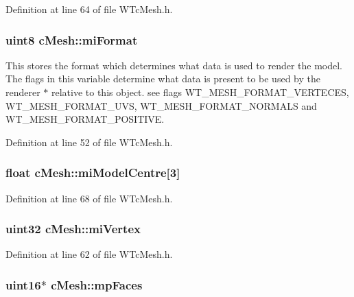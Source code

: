 Definition at line 64 of file WTcMesh.h.

\hypertarget{classc_mesh_a6a9c96e41eef3faed3c43ab69e8be5c6}{
\subsubsection[{miFormat}]{\setlength{\rightskip}{0pt plus 5cm}uint8 {\bf cMesh::miFormat}}}
\label{classc_mesh_a6a9c96e41eef3faed3c43ab69e8be5c6}


This stores the format which determines what data is used to render the model. The flags in this variable determine what data is present to be used by the renderer $\ast$ relative to this object. see flags WT\_\-MESH\_\-FORMAT\_\-VERTECES, WT\_\-MESH\_\-FORMAT\_\-UVS, WT\_\-MESH\_\-FORMAT\_\-NORMALS and WT\_\-MESH\_\-FORMAT\_\-POSITIVE. 



Definition at line 52 of file WTcMesh.h.

\hypertarget{classc_mesh_a98f60437f290f6476170b765aea19a91}{
\subsubsection[{miModelCentre}]{\setlength{\rightskip}{0pt plus 5cm}float {\bf cMesh::miModelCentre}\mbox{[}3\mbox{]}}}
\label{classc_mesh_a98f60437f290f6476170b765aea19a91}


Definition at line 68 of file WTcMesh.h.

\hypertarget{classc_mesh_a39c398b0ee0776f87a0ae9d7086ffa07}{
\subsubsection[{miVertex}]{\setlength{\rightskip}{0pt plus 5cm}uint32 {\bf cMesh::miVertex}}}
\label{classc_mesh_a39c398b0ee0776f87a0ae9d7086ffa07}


Definition at line 62 of file WTcMesh.h.

\hypertarget{classc_mesh_af8a4896437c76d1a858fe5474ae9b5a3}{
\subsubsection[{mpFaces}]{\setlength{\rightskip}{0pt plus 5cm}uint16$\ast$ {\bf cMesh::mpFaces}}}
\label{classc_mesh_af8a4896437c76d1a858fe5474ae9b5a3}


